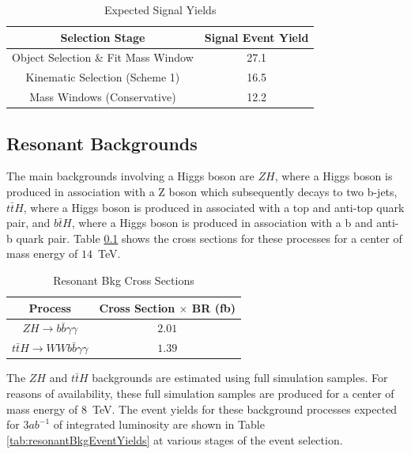\documentclass{cmspaper}
\begin{document}
\begin{table}[!ht]
\begin{center} 
\begin{tabular}{|c|c|}
\hline
Selection Stage                     &  Signal Event Yield    \\  \hline
Object Selection \& Fit Mass Window &  27.1                  \\ 
Kinematic Selection (Scheme 1)      &  16.5                  \\ 
Mass Windows (Conservative)         &  12.2                  \\ \hline

\end{tabular}
\caption{Expected Signal Yields }
\label{tab:signalEventYields}
\end{center}
\end{table}

\subsection{Resonant Backgrounds}
The main backgrounds involving a Higgs boson are $ZH$, where a Higgs boson is produced in association
with a Z boson which subsequently decays to two b-jets, $t\bar{t}H$, where a Higgs boson is produced
in associated with a top and anti-top quark pair, and $b\bar{t}H$, where a Higgs boson is produced in
association with a b and anti-b quark pair. Table \ref{} shows the cross sections for these processes
for a center of mass energy of $14$~TeV.


\begin{table}[!ht]
\begin{center} 
\begin{tabular}{|c|c|}
\hline
Process                                           &   Cross Section $\times$ BR (fb)   \\  \hline
$ZH \rightarrow b\bar{b}\gamma\gamma$             &   $2.01$                           \\\hline
$t\bar{t}H \rightarrow W W b \bar{b}\gamma\gamma$ &   $1.39$                           \\\hline

\end{tabular}
\caption{Resonant Bkg Cross Sections }
\label{tab:ResonantBkgCrossSections}
\end{center}
\end{table}

The $ZH$ and $t\bar{t}H$ backgrounds are estimated using full simulation samples. For reasons of 
availability, these full simulation samples are produced for a center of mass energy of $8$~TeV.
The event yields for these background processes expected for $3 ab^{-1}$ of integrated luminosity
are shown in Table \ref{tab:resonantBkgEventYields} at various stages of the event selection.
\end{document}
